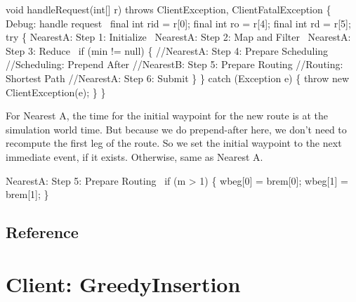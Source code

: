\nwenddocs{}\endmoddef\nwstartdeflinemarkup{}\nwenddeflinemarkup
void handleRequest(int[] r) throws ClientException, ClientFatalException \{
  \LA{}Debug: handle request~{\nwtagstyle{}}\RA{}
  final int rid = r[0];
  final int ro  = r[4];
  final int rd  = r[5];
  try \{
    \LA{}NearestA: Step 1: Initialize~{\nwtagstyle{}}\RA{}
    \LA{}NearestA: Step 2: Map and Filter~{\nwtagstyle{}}\RA{}
    \LA{}NearestA: Step 3: Reduce~{\nwtagstyle{}}\RA{}
    if (min != null) \{
      //NearestA: Step 4: Prepare Scheduling
      //Scheduling: Prepend After
      //NearestB: Step 5: Prepare Routing
      //Routing: Shortest Path
      //NearestA: Step 6: Submit
    \}
  \} catch (Exception e) \{
    throw new ClientException(e);
  \}
\}
\nwendcode{}\nwdocspar

For Nearest A, the time for the initial waypoint for the new route is at the
simulation world time. But because we do prepend-after here, we don't need to
recompute the first leg of the route. So we set the initial waypoint to the
next immediate event, if it exists. Otherwise, same as Nearest A.

\nwenddocs{}\endmoddef\nwstartdeflinemarkup\nwenddeflinemarkup
\LA{}NearestA: Step 5: Prepare Routing~{\nwtagstyle{}}\RA{}
if (m > 1) \{
    wbeg[0] = brem[0];
    wbeg[1] = brem[1];
\}
\nwendcode{}\nwdocspar

\section{Reference}

\nwenddocs{}\chapter{Client: GreedyInsertion}
\label{client-greedy}

